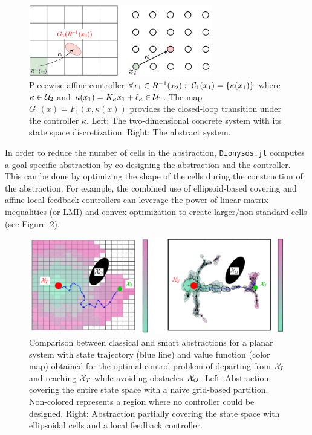 \documentclass{juliacon}
\begin{document}
\begin{figure}[t]
\centerline{\includegraphics[width=8cm]{Figures/Abstraction/Piece-wise-dependent.png}}
\caption{Piecewise affine controller $\forall x_1\in R^{-1}(x_2):\ \mathcal{C}_1(x_1) = \{\kappa(x_1)\}$ where $\kappa\in\mathcal{U}_2$ and $\kappa(x_1) = K_{\kappa}x_1 + \ell_{\kappa}\in  \mathcal{U}_1$.  The map $G_1(x) = F_1(x,\kappa(x))$ provides the closed-loop transition under the controller $\kappa$.
Left: The two-dimensional concrete system with its state space discretization. Right: The abstract system.}
	\label{fig:Piece-wise-dependent}
\end{figure}

\vskip 6pt
In order to reduce the number of cells in the abstraction, \texttt{Dionysos.jl} computes a goal-specific abstraction by co-designing the abstraction and the controller.
This can be done by optimizing the shape of the cells 
during the construction of the abstraction.
For example, the combined use of ellipsoid-based covering and affine local feedback controllers can leverage the power of linear matrix inequalities (or LMI) and convex optimization to create larger/non-standard cells (see Figure~\ref{fig:Full-vs-Partial}).

\begin{figure}[t]
\centerline{\includegraphics[width=\linewidth]{Figures/Solvers/Illustration.png}}
\caption{Comparison between classical and smart abstractions for a planar system with state trajectory (blue line) and value function (color map) obtained for the optimal control problem of departing from $\mathcal{X}_I$ and reaching $\mathcal{X}_T$ while avoiding obstacles~$\mathcal{X}_O$. 
Left: Abstraction covering the entire state space with a naive grid-based partition. Non-colored represents a region where no controller could be designed. Right: Abstraction partially covering the state space with ellipsoidal cells and a local feedback controller.}
	\label{fig:Full-vs-Partial}
\end{figure}
\end{document}
